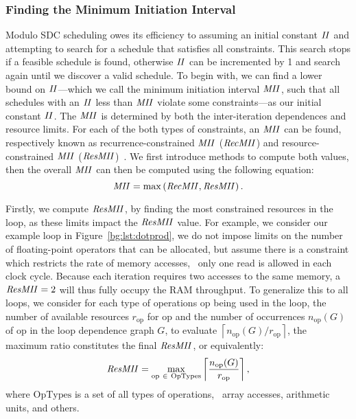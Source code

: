 \subsubsection{Finding the Minimum Initiation Interval}

Modulo SDC scheduling owes its efficiency to assuming an initial constant
$\mathit{II}$ and attempting to search for a schedule that satisfies all constraints.
This search stops if a feasible schedule is found, otherwise $\mathit{II}$ can be
incremented by 1 and search again until we discover a valid schedule.  To
begin with, we can find a lower bound on $\mathit{II}$---which we call the minimum
initiation interval $\mathit{MII}$, such that all schedules with an $\mathit{II}$ less than
$\mathit{MII}$ violate some constraints---as our initial constant $\mathit{II}$.  The $\mathit{MII}$ is
determined by both the inter-iteration dependences and resource limits.  For
each of the both types of constraints, an $\mathit{MII}$ can be found, respectively
known as recurrence-constrained $\mathit{MII}$ ($\mathit{RecMII}$) and resource-constrained
$\mathit{MII}$ ($\mathit{ResMII}$)~\cite{rau94, canis14, zhang13}.  We first introduce methods
to compute both values, then the overall $\mathit{MII}$ can then be computed using the
following equation:
\begin{equation}
    \mathit{MII} = \max\left(\mathit{RecMII}, \mathit{ResMII}\right).
\end{equation}

Firstly, we compute $\mathit{ResMII}$, by finding the most constrained resources in the
loop, as these limits impact the $\mathit{ResMII}$ value.  For example, we consider
our example loop in Figure~\ref{bg:lst:dotprod}, we do not impose limits on
the number of floating-point operators that can be allocated, but assume
there is a constraint which restricts the rate of memory accesses, \ie~only
one read is allowed in each clock cycle.  Because each iteration requires
two accesses to the same memory, a $\mathit{ResMII} = 2$ will thus fully occupy the
RAM throughput.  To generalize this to all loops, we consider for each type
of operations $\mathrm{op}$ being used in the loop, the number of available
resources $r_\mathrm{op}$ for $\mathrm{op}$ and the number of occurrences
$n_\mathrm{op}(G)$ of $\mathrm{op}$ in the loop dependence graph $G$, to
evaluate $\left\lceil n_\mathrm{op}(G) / r_\mathrm{op} \right\rceil$, the
maximum ratio constitutes the final $\mathit{ResMII}$, or equivalently:
\begin{equation}
    \mathit{ResMII} = \max_{\mathrm{op}~\in~\mathrm{OpTypes}}
        \left\lceil
            \frac{n_\mathrm{op}(G)}{r_\mathrm{op}}
        \right\rceil,
\end{equation}
where $\mathrm{OpTypes}$ is a set of all types of operations, \eg~array
accesses, arithmetic units, and others.

